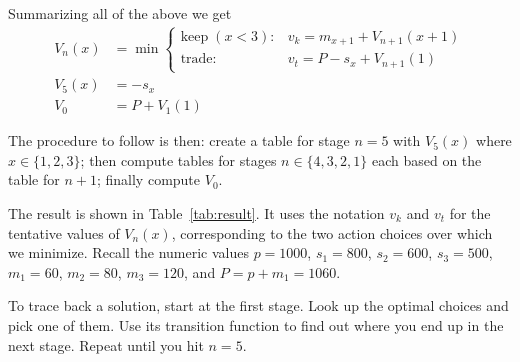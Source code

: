 \documentclass[a4paper]{article}
\begin{document}
Summarizing all of the above we get
\begin{align}
  V_n(x)
  &=
  \min
  \begin{cases}
    \text{keep}\; (x < 3):
    &
    v_k = m_{x+1} + V_{n+1}(x+1)
    \\
    \text{trade:}
    &
    v_t = P - s_x + V_{n+1}(1)
  \end{cases}
  \\
  V_5(x)
  &=
  -s_x
  \\
  V_0
  &=
  P + V_1(1)
\end{align}

The procedure to follow is then:
create a table for stage $n=5$ with $V_5(x)$ where $x\in\{1,2,3\}$;
then compute tables for stages $n\in\{4,3,2,1\}$ each based on the table for $n+1$;
finally compute $V_0$.

The result is shown in Table~\ref{tab:result}.
It uses the notation $v_k$ and $v_t$ for the tentative values of $V_n(x)$, corresponding to the two action choices over which we minimize.
Recall the numeric values $p=1000$, $s_1=800$, $s_2=600$, $s_3=500$, $m_1=60$, $m_2=80$, $m_3=120$, and $P=p+m_1=1060$.

To trace back a solution, start at the first stage.
Look up the optimal choices and pick one of them.
Use its transition function to find out where you end up in the next stage.
Repeat until you hit $n=5$.
\end{document}
